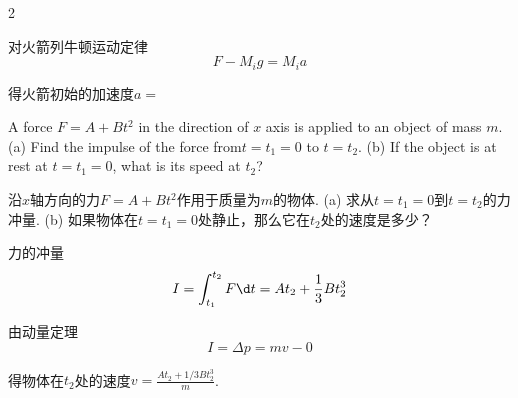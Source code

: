 \begin{multicols}{2}
{\begin{solution}
    对火箭列牛顿运动定律
    $$F-M_ig=M_ia$$
    
    得火箭初始的加速度$a=$
\end{solution}

\begin{problem}
    A force $F=A+Bt^2$ in the direction of $x$ axis is applied to an object of mass $m$. (a) Find the impulse of the force from$t=t_1=0$ to $t=t_2$. (b) If the object is at rest at $t=t_1=0$, what is its speed at $t_2$?
\end{problem}
\begin{translation}
    沿$x$轴方向的力$F=A+Bt^2$作用于质量为$m$的物体. (a) 求从$t=t_1=0$到$t=t_2$的力冲量. (b) 如果物体在$t=t_1=0$处静止，那么它在$t_2$处的速度是多少？
\end{translation}
\begin{solution}
    力的冲量
    $$I=\int_{t_1}^{t_2}{F\d t}=At_2+\frac{1}{3}Bt_2^3$$

    由动量定理
    $$I=\Delta p=mv-0$$
        
    得物体在$t_2$处的速度$v=\frac{At_2+1/3Bt_2^3}{m}$.
\end{solution}
}
\end{multicols}